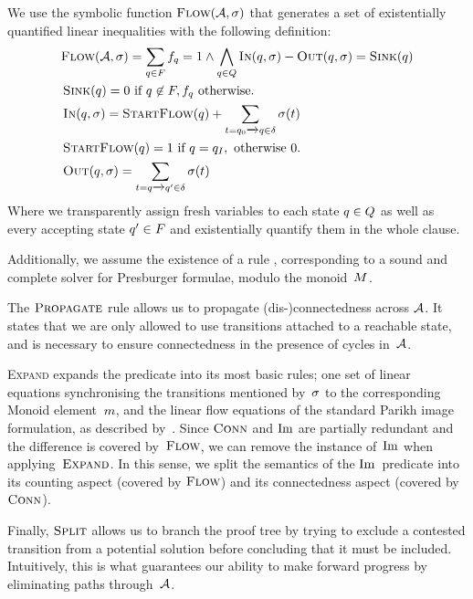 \documentclass[acmsmall,review,anonymous,screen]{acmart}\settopmatter{printfolios=true,printccs=false,printacmref=true}
\theoremstyle{definition}
\begin{document}
We use the symbolic function $\textsc{Flow}(\mathcal{A}, \operatorname{\sigma})$ that generates a set
of existentially quantified linear inequalities with the following definition:
$$
\begin{aligned}
  & \textsc{Flow}(\mathcal{A}, \operatorname{\sigma}) = \sum\limits_{q \in F} f_q = 1 \land \bigwedge\limits_{q \in Q} \operatorname{\textsc{In}}(q, \operatorname{\sigma}) - \operatorname{\textsc{Out}}(q, \operatorname{\sigma}) = \operatorname{\textsc{Sink}}(q) \\
  & \operatorname{\textsc{Sink}}(q) = 0 \text{ if } q \not\in F, f_q \text{ otherwise.} \\
  & \operatorname{\textsc{In}}(q, \operatorname{\sigma}) = \operatorname{\textsc{StartFlow}}(q) + \sum_{t = q_0 \xrightarrow{} q \in \delta} \operatorname{\sigma}(t)\\
  & \operatorname{\textsc{StartFlow}}(q)  = 1 \text{ if } q = q_I, \text{ otherwise $0$.} \\
  & \operatorname{\textsc{Out}}(q, \operatorname{\sigma}) = \sum_{t = q \xrightarrow{} q' \in \delta} \operatorname{\sigma}(t)
\end{aligned}
$$
Where we transparently assign fresh variables to each state $q \in
Q$ as well as every accepting state $q' \in F$ and
existentially quantify them in the whole clause. 

Additionally, we assume the existence of a rule \PresburgerClose{},
corresponding to a sound and complete solver for Presburger formulae, modulo the
monoid~$M$.

The $\textsc{Propagate}{}$ rule allows us to propagate (dis-)connectedness across
$\mathcal{A}$. It states that we are only allowed to use transitions attached to
a reachable state, and is necessary to ensure connectedness in the presence of
cycles in~$\mathcal{A}$.

\textsc{Expand} expands the predicate into its most basic rules; one set of
linear equations synchronising the transitions mentioned by~$\operatorname{\sigma}$ to the
corresponding Monoid element~$m$, and the linear flow equations of
the standard Parikh image formulation, as described by~\FlowEq. Since
$\operatorname{\textsc{Conn}}$ and $\operatorname{Im}$ are partially redundant and the difference is covered
by~$\textsc{Flow}$, we can remove the instance of~$\operatorname{Im}$ when applying~$\textsc{Expand}$. In
this sense, we split the semantics of the $\operatorname{Im}$~predicate into its counting
aspect (covered by $\textsc{Flow}$) and its connectedness aspect (covered by
$\operatorname{\textsc{Conn}}$).

Finally, $\textsc{Split}{}$ allows us to branch the proof tree by trying to exclude a
contested transition from a potential solution before concluding that it must be
included. Intuitively, this is what guarantees our ability to make forward
progress by eliminating paths through~$\mathcal{A}$.
\end{document}

